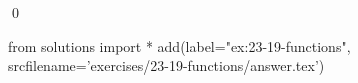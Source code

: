 
\begin{ex}
  \label{ex:23-19-functions}
  
  \qed
\end{ex}
\begin{python0}
from solutions import *
add(label="ex:23-19-functions",
    srcfilename='exercises/23-19-functions/answer.tex')
\end{python0}
